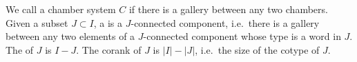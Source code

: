 \documentclass[11pt]{article}
\begin{document}
\begin{definition}\label{residues}
    We call a chamber system $C$  if there is a gallery between any two chambers. Given a subset $J\subset I$, a  is a $J$-connected component, i.e.\ there is a gallery between any two elements of a $J$-connected component whose type is a word in $J$. The  of $J$ is $I-J$. The corank of $J$ is $|I| -|J| $, i.e.\ the size of the cotype of $J$. 
\end{definition}







\end{document}
